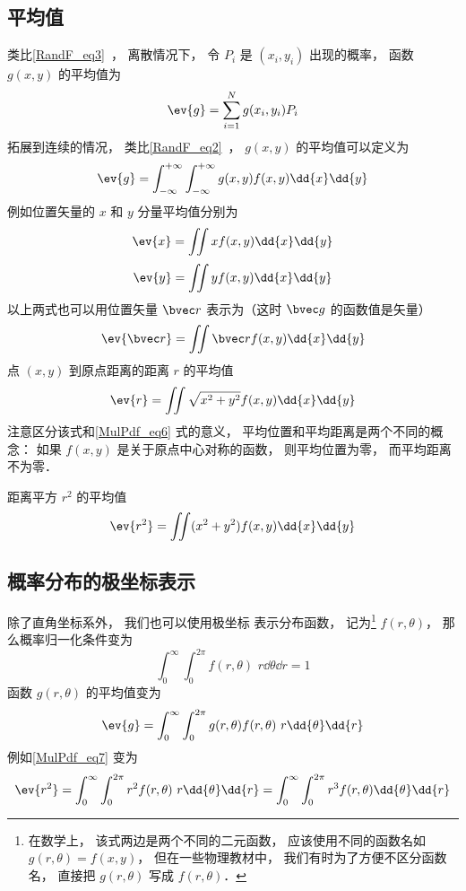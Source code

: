\subsection{平均值}
类比\autoref{RandF_eq3}~， 离散情况下， 令 $P_i$ 是 $(x_i, y_i)$ 出现的概率， 函数 $g(x,y)$ 的平均值为
\begin{equation}
\ev{g} = \sum_{i=1}^N g(x_i, y_i) P_i
\end{equation}
拓展到连续的情况， 类比\autoref{RandF_eq2}~， $g(x, y)$ 的平均值可以定义为
\begin{equation}
\ev{g} =  \int_{-\infty}^{+\infty} \int_{-\infty}^{+\infty} g(x, y) f(x, y) \dd{x} \dd{y}
\end{equation}
例如位置矢量的 $x$ 和 $y$ 分量平均值分别为
\begin{equation}\label{MulPdf_eq2}
\ev{x} = \iint x f(x, y) \dd{x}\dd{y}
\end{equation}
\begin{equation}
\ev{y} = \iint y f(x, y) \dd{x}\dd{y}
\end{equation}
以上两式也可以用位置矢量 $\bvec r$ 表示为（这时 $\bvec g$ 的函数值是矢量）
\begin{equation}\label{MulPdf_eq6}
\ev{\bvec r} = \iint \bvec r f(x, y) \dd{x}\dd{y}
\end{equation}
点 $(x,y)$ 到原点距离的距离 $r$ 的平均值
\begin{equation}
\ev{r} = \iint \sqrt{x^2 + y^2} f(x, y) \dd{x}\dd{y}
\end{equation}
注意区分该式和\autoref{MulPdf_eq6} 式的意义， 平均位置和平均距离是两个不同的概念： 如果 $f(x, y)$ 是关于原点中心对称的函数， 则平均位置为零， 而平均距离不为零．

距离平方 $r^2$ 的平均值
\begin{equation}\label{MulPdf_eq7}
\ev{r^2} = \iint (x^2 + y^2) f(x, y) \dd{x}\dd{y}
\end{equation}

\subsection{概率分布的极坐标表示}

除了直角坐标系外， 我们也可以使用极坐标 表示分布函数， 记为\footnote{在数学上， 该式两边是两个不同的二元函数， 应该使用不同的函数名如 $g(r, \theta) = f(x, y)$， 但在一些物理教材中， 我们有时为了方便不区分函数名， 直接把 $g(r, \theta)$ 写成 $f(r, \theta)$．} $f(r, \theta)$， 那么概率归一化条件变为
\begin{equation}\label{MulPdf_eq1}
\int_0^\infty \int_{0}^{2\pi} f(r, \theta)\,\, r\dd{\theta}\dd{r} = 1
\end{equation}
函数 $g(r, \theta)$ 的平均值变为
\begin{equation}
\ev{g} = \int_0^\infty \int_{0}^{2\pi} g(r, \theta) f(r, \theta)\,\, r\dd{\theta}\dd{r}
\end{equation}
例如\autoref{MulPdf_eq7} 变为
\begin{equation}\label{MulPdf_eq3}
\ev{r^2} = \int_0^\infty \int_{0}^{2\pi} r^2 f(r, \theta)\,\, r\dd{\theta}\dd{r}
= \int_0^\infty \int_{0}^{2\pi} r^3 f(r, \theta) \dd{\theta}\dd{r}
\end{equation}


